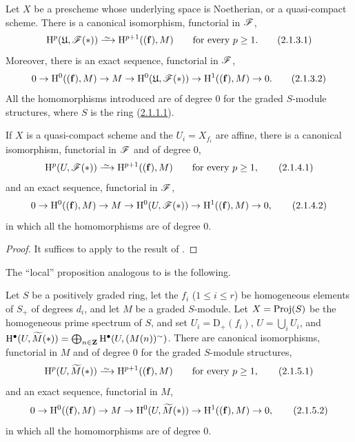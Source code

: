 \begin{proposition}[2.1.3]
\label{III.2.1.3}
Let $X$ be a prescheme whose underlying space is Noetherian, or a quasi-compact scheme.
There is a canonical isomorphism, functorial in $\mathscr{F}$,
\[
\label{III.2.1.3.1}
  \HH^p(\mathfrak{U},\sh{F}(*)) \simto \HH^{p+1}((\mathbf{f}),M)
  \qquad\text{for every } p\geq 1.
  \tag{2.1.3.1}
\]
Moreover, there is an exact sequence, functorial in $\mathscr{F}$,
\[
\label{III.2.1.3.2}
  0 \to \mathrm{H}^0((\mathbf{f}),M) \to M \to \mathrm{H}^0(\mathfrak{U},\mathscr{F}(*)) \to \mathrm{H}^1((\mathbf{f}),M) \to 0.
  \tag{2.1.3.2}
\]
All the homomorphisms introduced are of degree $0$ for the graded $S$-module structures, where $S$ is the ring (\hyperref[III.2.1.1.1]{2.1.1.1}).
\end{proposition}

\begin{corollary}[2.1.4]
\label{III.2.1.4}
If $X$ is a quasi-compact scheme and the $U_i=X_{f_i}$ are affine, there is a canonical isomorphism, functorial in $\mathscr{F}$ and of degree $0$,
\[
\label{III.2.1.4.1}
  \HH^p(U,\sh{F}(*)) \simto \HH^{p+1}((\mathbf{f}),M)
  \qquad\text{for every } p\geq 1,
  \tag{2.1.4.1}
\]
and an exact sequence, functorial in $\mathscr{F}$,
\[
\label{III.2.1.4.2}
  0 \to \mathrm{H}^0((\mathbf{f}),M) \to M \to \mathrm{H}^0(U,\mathscr{F}(*)) \to \mathrm{H}^1((\mathbf{f}),M) \to 0,
  \tag{2.1.4.2}
\]
in which all the homomorphisms are of degree $0$.
\end{corollary}

\begin{proof}
It suffices to apply  to the result of .
\end{proof}

The ``local'' proposition analogous to  is the following.

\begin{proposition}[2.1.5]
\label{III.2.1.5}
Let $S$ be a positively graded ring, let the $f_i$ ($1\leq i\leq r$) be homogeneous elements of $S_+$ of degrees $d_i$, and let $M$ be a graded $S$-module.
Let $X=\operatorname{Proj}(S)$ be the homogeneous prime spectrum of $S$, and set $U_i=\mathrm{D}_+(f_i)$, $U=\bigcup_i U_i$, and $\mathrm{H}^\bullet(U,\widetilde{M}(*))=\bigoplus_{n\in\mathbf{Z}}\mathrm{H}^\bullet(U,(M(n))^\sim)$.
There are canonical isomorphisms, functorial in $M$ and of degree $0$ for the graded $S$-module structures,
\[
\label{III.2.1.5.1}
  \HH^p(U,\widetilde{M}(*)) \simto \HH^{p+1}((\mathbf{f}),M)
  \qquad\text{for every } p\geq 1,
  \tag{2.1.5.1}
\]
and an exact sequence, functorial in $M$,
\[
\label{III.2.1.5.2}
  0 \to \mathrm{H}^0((\mathbf{f}),M) \to M \to \mathrm{H}^0(U,\widetilde{M}(*)) \to \mathrm{H}^1((\mathbf{f}),M) \to 0,
  \tag{2.1.5.2}
\]
in which all the homomorphisms are of degree $0$.
\end{proposition}

